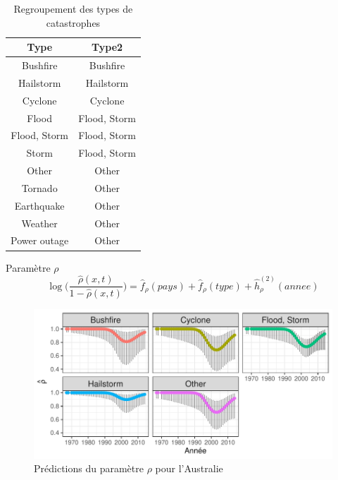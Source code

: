 \begin{frame}
\begin{table}[ht]
\centering
\begin{tabular}{cc}
  \hline
Type & Type2 \\ 
  \hline
Bushfire & Bushfire \\ 
  Hailstorm & Hailstorm \\ 
  Cyclone & Cyclone \\ 
  Flood & Flood, Storm \\ 
  Flood, Storm & Flood, Storm \\ 
  Storm & Flood, Storm \\ 
  Other & Other \\ 
  Tornado & Other \\ 
  Earthquake & Other \\ 
  Weather & Other \\ 
  Power outage & Other \\ 
   \hline
\end{tabular}
\caption{Regroupement des types de catastrophes} 
\label{tab:3.7}
\end{table}\end{frame}


\begin{frame}{Paramètre $\rho$}
\begin{equation*}
\log\Bigg(\frac{\hat\rho(x,t)}{1-\hat\rho(x,t)}\Bigg) = \hat{f}_\rho(pays) + \hat{f}_\rho(type) + \hat{h}^{(2)}_\rho(annee)
\end{equation*}
\end{frame}

\begin{frame}
\begin{figure}
\includegraphics[width=.8\textwidth]{images/fig-023.pdf}
\caption{Prédictions du paramètre $\rho$ pour l'Australie}
\end{figure}
\end{frame}


